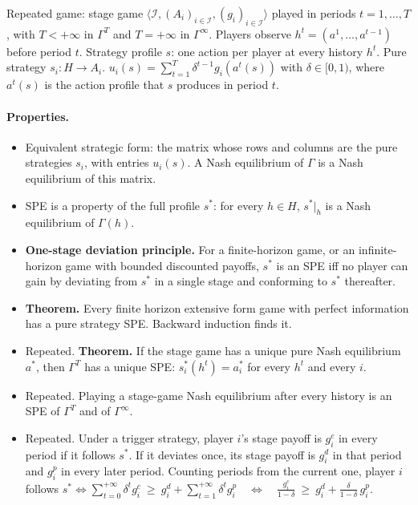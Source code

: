 \documentclass{article}
\newcommand{\res}[1]{\textbf{#1.}}
\begin{document}
Repeated game: stage game $\langle\mathcal I,(A_i)_{i\in\mathcal I},(g_i)_{i\in\mathcal I}\rangle$ played in periods $t=1,\dots,T$, with $T<+\infty$ in $\Gamma^T$ and $T=+\infty$ in $\Gamma^\infty$.
Players observe $h^t=(a^1,\dots,a^{t-1})$ before period $t$.
Strategy profile $s$: one action per player at every history $h^t$.
Pure strategy $s_i:H\to A_i$.
$u_i(s)=\sum_{t=1}^{T}\delta^{t-1}g_i(a^t(s))$ with $\delta\in[0,1)$, where $a^t(s)$ is the action profile that $s$ produces in period $t$.

\paragraph{Properties.}
\begin{itemize}
    \item Equivalent strategic form: the matrix whose rows and columns are the pure strategies $s_i$, with entries $u_i(s)$. A Nash equilibrium of $\Gamma$ is a Nash equilibrium of this matrix.
    \item SPE is a property of the full profile $s^*$: for every $h\in H$, $s^*\vert_h$ is a Nash equilibrium of $\Gamma(h)$.
    \item \res{One-stage deviation principle} For a finite-horizon game, or an infinite-horizon game with bounded discounted payoffs, $s^*$ is an SPE iff no player can gain by deviating from $s^*$ in a single stage and conforming to $s^*$ thereafter.
    \item \res{Theorem} Every finite horizon extensive form game with perfect information has a pure strategy SPE. Backward induction finds it.
    \item Repeated. \res{Theorem} If the stage game has a unique pure Nash equilibrium $a^*$, then $\Gamma^T$ has a unique SPE: $s_i^*(h^t)=a_i^*$ for every $h^t$ and every $i$.
    \item Repeated. Playing a stage-game Nash equilibrium after every history is an SPE of $\Gamma^T$ and of $\Gamma^\infty$.
    \item Repeated. Under a trigger strategy, player $i$'s stage payoff is $g_i^c$ in every period if it follows $s^*$. If it deviates once, its stage payoff is $g_i^d$ in that period and $g_i^p$ in every later period. Counting periods from the current one, player $i$ follows 
    $s^* 
    \iff\sum_{t=0}^{+\infty}\delta^t g_i^c\ \ge\ g_i^d+\sum_{t=1}^{+\infty}\delta^t g_i^p
    \quad\iff\quad
    \frac{g_i^c}{1-\delta}\ \ge\ g_i^d+\frac{\delta}{1-\delta}\,g_i^p.$
\end{itemize}
\end{document}
